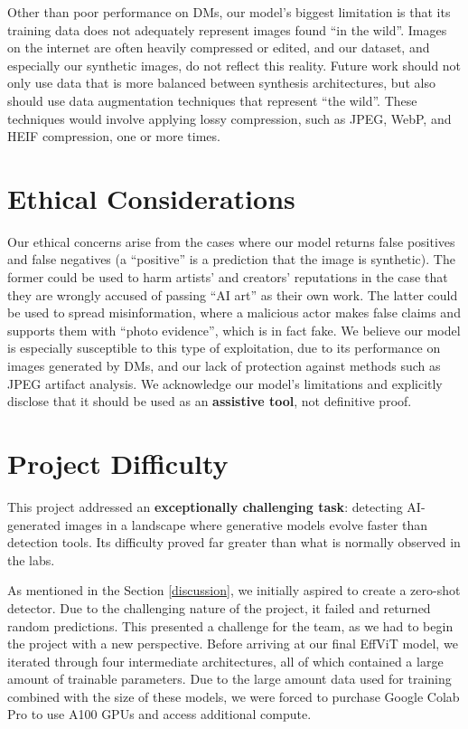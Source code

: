 \documentclass{article} %
\begin{document}
Other than poor performance on DMs, our model's biggest limitation is that its training data does not adequately represent images found ``in the wild''. Images on the internet are often heavily compressed or edited, and our dataset, and especially our synthetic images, do not reflect this reality. Future work should not only use data that is more balanced between synthesis architectures, but also should use data augmentation techniques that represent ``the wild''. These techniques would involve applying lossy compression, such as JPEG, WebP, and HEIF compression, one or more times.

\section{Ethical Considerations}

Our ethical concerns arise from the cases where our model returns false positives and false negatives (a ``positive'' is a prediction that the image is synthetic). The former could be used to harm artists' and creators' reputations in the case that they are wrongly accused of passing ``AI art'' as their own work. The latter could be used to spread misinformation, where a malicious actor makes false claims and supports them with ``photo evidence'', which is in fact fake. We believe our model is especially susceptible to this type of exploitation, due to its performance on images generated by DMs, and our lack of protection against methods such as JPEG artifact analysis. We acknowledge our model's limitations and explicitly disclose that it should be used as an \textbf{assistive tool}, not definitive proof.

\section{Project Difficulty}

This project addressed an \textbf{exceptionally challenging task}: detecting AI-generated images in a landscape where generative models evolve faster than detection tools. Its difficulty proved far greater than what is normally observed in the labs.

As mentioned in the Section \ref{discussion}, we initially aspired to create a zero-shot detector. Due to the challenging nature of the project, it failed and returned random predictions. This presented a challenge for the team, as we had to begin the project with a new perspective. Before arriving at our final EffViT model, we iterated through four intermediate architectures, all of which contained a large amount of trainable parameters. Due to the large amount data used for training combined with the size of these models, we were forced to purchase Google Colab Pro to use A100 GPUs and access additional compute.
\end{document}

